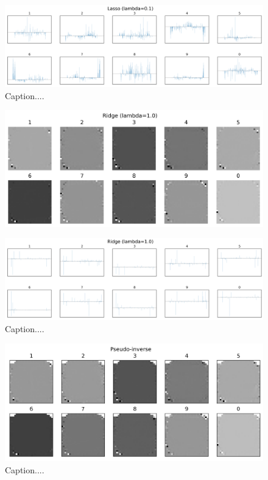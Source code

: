 \documentclass[10pt]{article}
\begin{document}
\begin{figure}[ht]
\centerline{\includegraphics[scale=0.5]{figures/bar_plot_loadings_lasso_01.png}}
\caption{Caption....}
\label{fig7b}
\end{figure}

\begin{figure}[ht]
\centerline{\includegraphics[scale=0.8]{figures/weight_matrix_ridge.png}}
\label{fig8a}
\end{figure}

\begin{figure}[ht]
\centerline{\includegraphics[scale=0.5]{figures/bar_plot_loadings_ridge.png}}
\caption{Caption....}
\label{fig8b}
\end{figure}

\begin{figure}[ht]
\centerline{\includegraphics[scale=0.75]{figures/weight_matrix_pinv_no_zeros.png}}
\caption{Caption....}
\label{fig9}
\end{figure}
\end{document}
